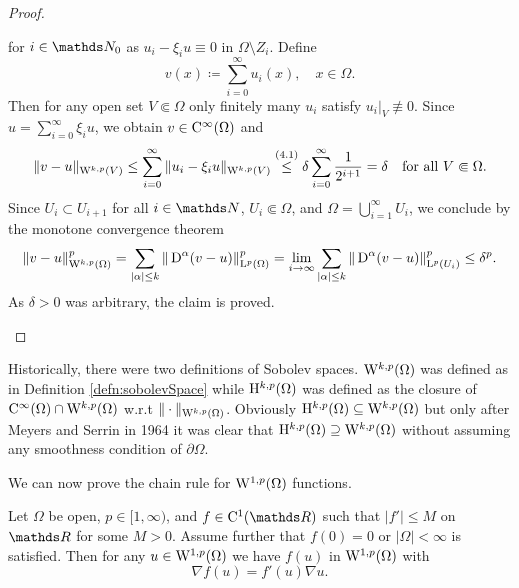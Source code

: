 \begin{proof}
\begin{enumerate}[i)]
\begin{equation}
    \end{equation}
    for $i \in \N_0$ as $u_i - \xi_i u \equiv 0$ in $\Omega \setminus Z_i$.
    Define
    $$
    v(x) \coloneqq \sum_{i = 0}^\infty u_i(x), \quad x \in \Omega.
    $$
    Then for any open set $V \Subset \Omega$ only finitely many $u_i$ satisfy $u_i|_V \not\equiv 0$.
    Since $u = \sum_{i = 0}^\infty \xi_i u$, we obtain $v \in \mathrm{C}^\infty(\Omega)$ and
    $$
    \|v - u\|_{\mathrm{W}^{k,p}(V)}
    \leq \sum_{i = 0}^\infty \|u_i - \xi_i u\|_{\mathrm{W}^{k,p}(V)}
    \overset{(4.1)}{\leq} \delta \sum_{i = 0}^\infty \frac{1}{2^{i + 1}} 
    = \delta \quad\text{for all } V \Subset \Omega.
    $$
    Since $U_i \subset U_{i + 1}$ for all $i \in \N$, $U_i \Subset \Omega$, and $\Omega = \bigcup_{i = 1}^\infty U_i$, we conclude by the monotone convergence theorem
    $$
    \|v - u\|_{\mathrm{W}^{k,p}(\Omega)}^p
    = \sum_{|\alpha| \leq k} \|\,{\operatorname{D}}^\alpha (v - u) \|_{\mathrm{L}^p(\Omega)}^p
    = \lim_{i \to \infty} \sum_{|\alpha| \leq k} \|\,{\operatorname{D}}^\alpha(v - u) \|_{\mathrm{L}^p(U_i)}^p
    \leq \delta^p.
    $$
    As $\delta > 0$ was arbitrary, the claim is proved. \qedhere
\end{enumerate}
\end{proof}

\begin{rem}
  Historically, there were two definitions of Sobolev spaces.
  $\mathrm{W}^{k,p}(\Omega)$ was defined as in Definition \ref{defn:sobolevSpace} while $\mathrm{H}^{k,p}(\Omega)$ was defined as the closure of $\mathrm{C}^\infty(\Omega) \cap \mathrm{W}^{k,p}(\Omega)$ w.r.t $\|\cdot\|_{\mathrm{W}^{k,p}(\Omega)}$.
  Obviously $\mathrm{H}^{k,p}(\Omega) \subseteq \mathrm{W}^{k,p}(\Omega)$ but only after Meyers and Serrin in 1964 \cite{meyers1964} it was clear that $\mathrm{H}^{k,p}(\Omega) \supseteq \mathrm{W}^{k,p}(\Omega)$ without assuming any smoothness condition of $\partial \Omega$.
\end{rem}

We can now prove the chain rule for $\mathrm{W}^{1,p}(\Omega)$ functions.

\begin{prop}
  \label{prop:sobolevChainrule}
  Let $\Omega$ be open, $p \in [1,\infty)$, and $f \in \CC^1(\R)$ such that $|f'| \leq M$ on $\R$ for some $M > 0$.
  Assume further that $f(0) = 0$ or $|\Omega| < \infty$ is satisfied.
  Then for any $u \in \mathrm{W}^{1,p}(\Omega)$ we have $f(u)$ in $\mathrm{W}^{1,p}(\Omega)$ with $$\nabla f(u) = f'(u) \nabla u.$$
\end{prop}

